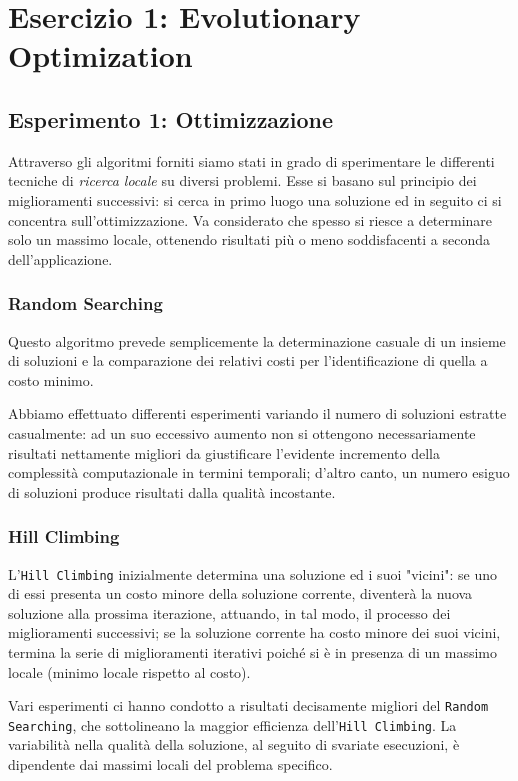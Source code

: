 \raggedright
{}
	\label{ch:opt}
	\section{Esercizio 1: Evolutionary Optimization}
		\label{sec:es1}
		\subsection{Esperimento 1: Ottimizzazione}
			Attraverso gli algoritmi forniti siamo stati in grado di sperimentare le differenti tecniche di \emph{ricerca locale} su diversi problemi. Esse si basano sul principio dei miglioramenti successivi: si cerca in primo luogo una soluzione ed in seguito ci si concentra sull'ottimizzazione. Va considerato che spesso si riesce a determinare solo un massimo locale, ottenendo risultati più o meno soddisfacenti a seconda dell'applicazione.
			\subsubsection{Random Searching}
				Questo algoritmo prevede semplicemente la determinazione casuale di un insieme di soluzioni e la comparazione dei relativi costi per l'identificazione di quella a costo minimo.\par
				Abbiamo effettuato differenti esperimenti variando il numero di soluzioni estratte casualmente: ad un suo eccessivo aumento non si ottengono necessariamente risultati nettamente migliori da giustificare l'evidente incremento della complessità computazionale in termini temporali; d'altro canto, un numero esiguo di soluzioni produce risultati dalla qualità incostante.
			\subsubsection{Hill Climbing}
				L'\texttt{Hill Climbing} inizialmente determina una soluzione ed i suoi "vicini": se uno di essi presenta un costo minore della soluzione corrente, diventerà la nuova soluzione alla prossima iterazione, attuando, in tal modo, il processo dei miglioramenti successivi; se la soluzione corrente ha costo minore dei suoi vicini, termina la serie di miglioramenti iterativi poiché si è in presenza di un massimo locale (minimo locale rispetto al costo).\par
				Vari esperimenti ci hanno condotto a risultati decisamente migliori del \texttt{Random Searching}, che sottolineano la maggior efficienza dell'\texttt{Hill Climbing}. La variabilità nella qualità della soluzione, al seguito di svariate esecuzioni, è dipendente dai massimi locali del problema specifico.

